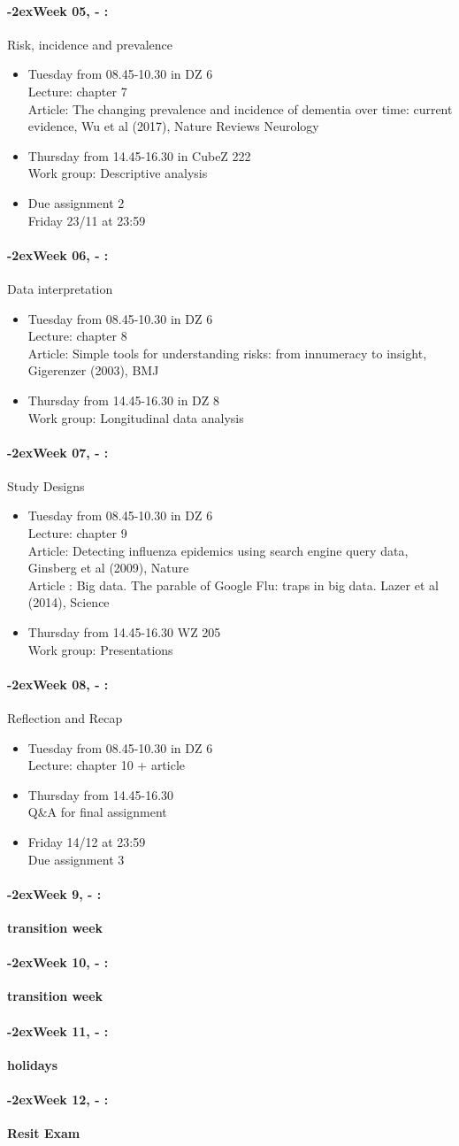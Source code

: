 \documentclass[11pt]{article}
\newcommand{\week}[1]{%
  \paragraph*{\kern-2ex\quad #1, \syldate{\today} - \AdvanceDate[4]\syldate{\today}:}%
  \ifdim\wd1=\wd\MONDAY
    \AdvanceDate[7]
  \else
    \AdvanceDate[7]
  \fi%
}
\begin{document}
\week{Week 05} Risk, incidence and prevalence
\begin{itemize}
\item Tuesday from 08.45-10.30 in DZ 6 \\
Lecture: chapter 7 \\
Article: The changing prevalence and incidence of dementia over time: current evidence, Wu et al (2017), Nature Reviews Neurology 
\item Thursday from 14.45-16.30 in CubeZ 222 \\
Work group: Descriptive analysis 
\item Due assignment 2 \\
Friday 23/11 at 23:59
\end{itemize}

\week{Week 06} Data interpretation
\begin{itemize}
\item Tuesday from 08.45-10.30 in DZ 6 \\
Lecture: chapter 8 \\
Article: Simple tools for understanding risks: from innumeracy to insight, Gigerenzer (2003), BMJ
\item Thursday from 14.45-16.30 in DZ 8 \\
Work group: Longitudinal data analysis 
\end{itemize}

\week{Week 07} Study Designs
\begin{itemize}
\item Tuesday from 08.45-10.30 in DZ 6 \\
Lecture: chapter 9 \\
Article: Detecting influenza epidemics using search engine query data, Ginsberg et al (2009), Nature \\
Article : Big data. The parable of Google Flu: traps in big data. Lazer et al (2014), Science 
\item Thursday from 14.45-16.30 WZ 205 \\
Work group: Presentations 
\end{itemize}

\week{Week 08} Reflection and Recap
\begin{itemize}
\item Tuesday from 08.45-10.30 in DZ 6\\
Lecture: chapter 10 + article
\item Thursday from 14.45-16.30\\
Q\&A for final assignment
\item Friday 14/12 at 23:59\\
Due assignment 3 
\end{itemize}

\week{Week 9} \textbf{transition week}
\week{Week 10} \textbf{transition week}
\week{Week 11} \textbf{holidays}
\week{Week 12} \textbf{Resit Exam}
\end{document}
